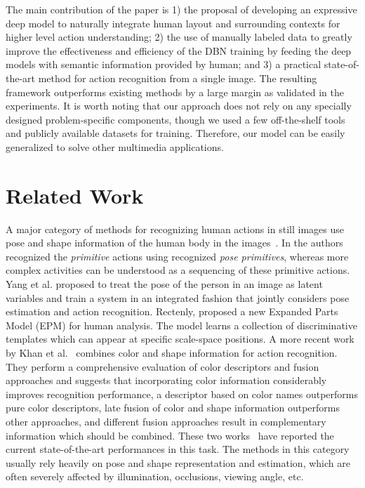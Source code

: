 \documentclass{article}
\begin{document}
The main contribution of the paper is 1) the proposal of developing an expressive deep model to naturally integrate human layout and surrounding contexts for higher level action understanding; 2) the use of manually labeled data to greatly improve the effectiveness and efficiency of the DBN training by feeding the deep models with semantic information provided by human; and 3) a practical state-of-the-art method for action recognition from a single image.  The resulting framework outperforms existing methods by a large margin as validated in the experiments.  It is worth noting that our approach does not rely on any specially designed problem-specific components, though we used a few off-the-shelf tools and publicly available datasets for training.  Therefore, our model can be easily generalized to solve other multimedia applications.

\section{Related Work}

A major category of methods for recognizing human actions in still images use pose and shape information of the human body in the images~\cite{XuReID13}.  In \cite{Thurau08} the authors recognized the \textit{primitive} actions using recognized \textit{pose primitives}, whereas more complex activities can be understood as a sequencing of these primitive actions.  Yang et al.\cite{Yang10} proposed to treat the pose of the person in an image as latent variables and train a system in an integrated fashion that jointly considers pose estimation and action recognition.  Rectenly, \cite{Sharma13} proposed a new Expanded Parts Model (EPM) for human analysis.  The model learns a collection of discriminative templates which can appear at specific scale-space positions.   A more recent work by Khan et al.~\cite{Khan13} combines color and shape information for action recognition.  They perform a comprehensive evaluation of color descriptors and fusion approaches and suggests that incorporating color
information considerably improves recognition performance, a descriptor based on color names
outperforms pure color descriptors, late fusion of color and shape information outperforms other approaches, and different fusion approaches result in complementary information which should be combined.  These two works~\cite{Sharma13, Khan13} have reported the current state-of-the-art performances in this task.  The methods in this category usually rely heavily on pose and shape representation and estimation, which are often severely affected by illumination, occlusions, viewing angle, etc.
\end{document}
